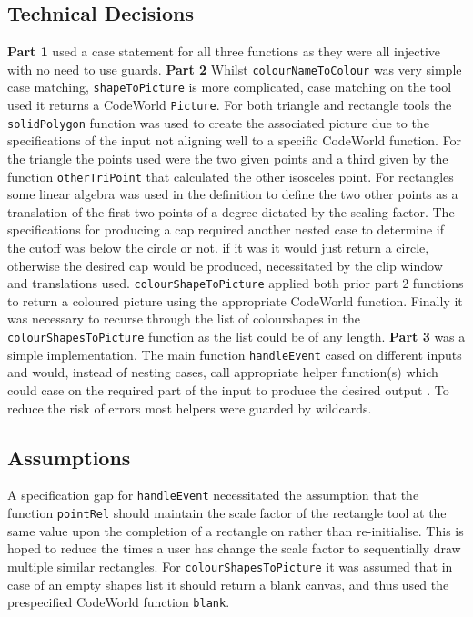 \documentclass[11pt]{article}
\begin{document}
\subsection{Technical Decisions}
\textbf{Part 1} used a case statement for all three functions as they were all  injective with no need to use guards.
 \textbf{Part 2} Whilst \verb|colourNameToColour| was  very simple case matching, \verb|shapeToPicture| is more complicated, case matching on the tool used it returns a CodeWorld \verb|Picture|. For both triangle and rectangle tools the \verb|solidPolygon| function was used to create the associated picture due to the specifications of the input not aligning well to a specific CodeWorld function. For the triangle the points used were the two given points and a third given by the function \verb|otherTriPoint| that calculated the other isosceles point. For rectangles some linear algebra was used in the definition to define the two other points as a translation of the first two points of a degree dictated by the scaling factor. The specifications for producing a cap required another nested case to determine if the cutoff was below the circle or not. if it was it would just return a circle, otherwise the desired cap would be produced, necessitated by the clip window and translations used. \verb|colourShapeToPicture| applied both prior part 2 functions to return a coloured picture using the appropriate CodeWorld function. Finally it was necessary to recurse through the list of colourshapes in the \verb|colourShapesToPicture| function as the list could be of any length.
 \textbf{Part 3} was a simple implementation. The main function \verb|handleEvent| cased on different inputs and would, instead of nesting cases, call appropriate helper function(s) which could case on the required part of the input to produce the desired output .  To reduce the risk of errors most helpers were guarded by wildcards.

\subsection{Assumptions}%
A specification gap for \verb|handleEvent| necessitated the assumption that the function \verb|pointRel| should maintain the scale factor of the rectangle tool at the same value upon the completion of a rectangle on rather than re-initialise. This is hoped to reduce the times a user has change the scale factor to sequentially draw multiple similar rectangles. For \verb|colourShapesToPicture| it was assumed that in case of an empty shapes list it should return a blank canvas, and thus used the prespecified CodeWorld function \verb|blank|.
\end{document}

